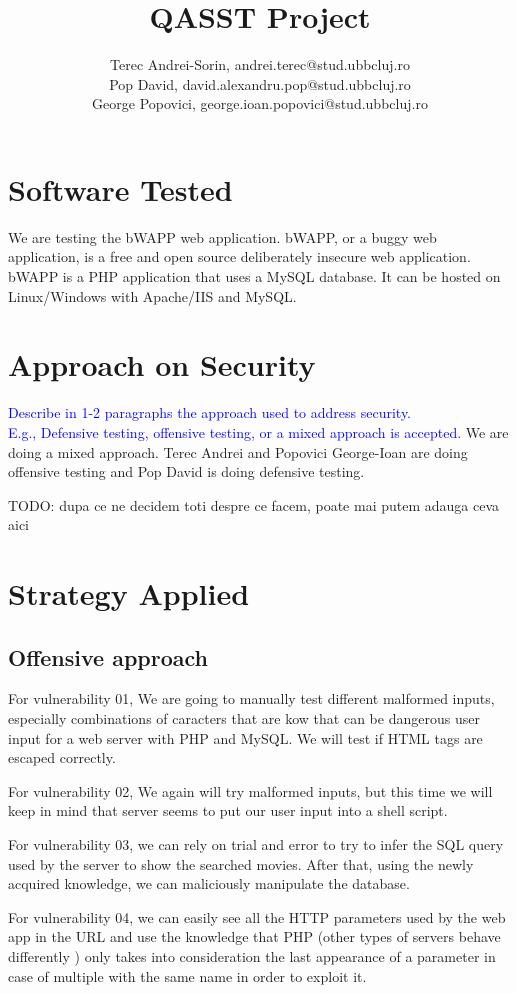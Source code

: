 \documentclass{article}
\title{\textbf{QASST Project}}
\author{Terec Andrei-Sorin, andrei.terec@stud.ubbcluj.ro\\
Pop David, david.alexandru.pop@stud.ubbcluj.ro\\
George Popovici, george.ioan.popovici@stud.ubbcluj.ro}
\begin{document}
\maketitle


\tableofcontents

\newpage

\section{Software Tested}
\label{label:Software_tested}

We are testing the bWAPP web application.
bWAPP, or a buggy web application, is a free and open source deliberately insecure web application.
bWAPP is a PHP application that uses a MySQL database. It can be hosted on Linux/Windows with Apache/IIS and MySQL.

\section{Approach on Security}
\label{}

\textcolor{blue}{Describe in 1-2 paragraphs the approach used to address security. \\
    E.g., Defensive testing, offensive testing, or a mixed approach is accepted.
}
We are doing a mixed approach.
Terec Andrei and Popovici George-Ioan are doing offensive testing and Pop David is doing defensive testing.

TODO: dupa ce ne decidem toti despre ce facem, poate mai putem adauga ceva aici

\section{Strategy Applied}
\label{}

\subsection{Offensive approach}
\par For vulnerability 01, We are going to manually test different malformed inputs, especially combinations of caracters that are kow that can be dangerous user input for a web server with PHP and MySQL. We will test if HTML tags are escaped correctly.
\par For vulnerability 02, We again will try malformed inputs, but this time we will keep in mind that server seems to put our user input into a shell script.
\par For vulnerability 03, we can rely on trial and error to try to infer the SQL query used by the server to show the searched movies. After that, using the newly acquired knowledge, we can maliciously manipulate the database.
\par For vulnerability 04, we can easily see all the HTTP parameters used by the web app in the URL and use the knowledge that PHP (other types of servers behave differently \cite{vul:httppp-extra}) only takes into consideration the last appearance of a parameter in case of multiple with the same name in order to exploit it.
\end{document}

